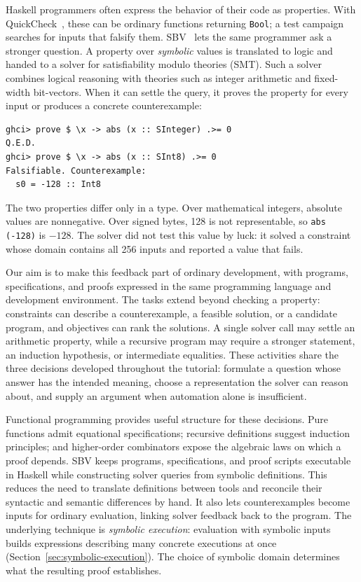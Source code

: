 \documentclass[review]{jfp-epi}
\newcommand{\code}[1]{\texttt{#1}}
\begin{document}
Haskell programmers often express the behavior of their code as properties.
With QuickCheck~\citep{quickcheck}, these can be ordinary functions returning
\code{Bool}; a test campaign searches for inputs that falsify them. SBV~\citep{sbv} lets
the same programmer ask a stronger question. A property over \emph{symbolic}
values is translated to logic and handed to a solver for satisfiability modulo
theories (SMT). Such a solver combines logical reasoning with theories such as
integer arithmetic and fixed-width bit-vectors. When it can settle the query,
it proves the property for every input or produces a concrete counterexample:
\begin{lstlisting}
ghci> prove $ \x -> abs (x :: SInteger) .>= 0
Q.E.D.
ghci> prove $ \x -> abs (x :: SInt8) .>= 0
Falsifiable. Counterexample:
  s0 = -128 :: Int8
\end{lstlisting}
The two properties differ only in a type. Over mathematical integers, absolute
values are nonnegative. Over signed bytes, 128 is not representable, so
\code{abs (-128)} is $-128$. The solver did not test this value by luck: it
solved a constraint whose domain contains all 256 inputs and reported a value
that fails.

Our aim is to make this feedback part of ordinary development, with programs,
specifications, and proofs expressed in the same programming language and
development environment. The tasks extend beyond checking a property:
constraints can describe a counterexample, a feasible solution, or a candidate
program, and objectives can rank the solutions. A single solver call may settle
an arithmetic property, while a recursive program may require a stronger
statement, an induction hypothesis, or intermediate equalities. These activities
share the three decisions developed throughout the tutorial: formulate a question
whose answer has the intended meaning, choose a representation the solver can
reason about, and supply an argument when automation alone is insufficient.

Functional programming provides useful structure for these decisions. Pure
functions admit equational specifications; recursive definitions suggest
induction principles; and higher-order combinators expose the algebraic laws on
which a proof depends. SBV keeps programs, specifications, and proof scripts
executable in Haskell while constructing solver queries from symbolic definitions.
This reduces the need to translate definitions between tools and reconcile their
syntactic and semantic differences by hand. It also lets counterexamples become
inputs for ordinary evaluation, linking solver feedback back to the program.
The underlying technique is \emph{symbolic execution}: evaluation with symbolic
inputs builds expressions describing many concrete executions at once
(Section~\ref{sec:symbolic-execution}).
The choice of symbolic domain determines what the resulting proof establishes.
\end{document}
